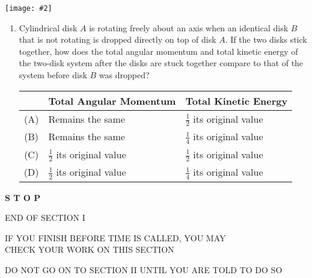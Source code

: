 \documentclass[11pt]{article}
\newcommand{\pic}[2]{\texttt{[image: \#2]}}
\begin{document}
\newpage
\begin{center}
  \pic{.3}{disks}
  
  \begin{minipage}{.6\textwidth}
    \begin{enumerate}[leftmargin=18pt,start=30]
  \item Cylindrical disk $A$ is rotating freely about an axis when an
    identical disk $B$ that is not rotating is dropped directly on top of disk
    $A$. If the two disks stick together, how does the total angular momentum
    and total kinetic energy of the two-disk system after the disks are stuck
    together compare to that of the system before disk $B$ was dropped?
      
    \begin{tabular}{cll}
      & Total Angular Momentum & Total Kinetic Energy\\
      \hline
      (A) & Remains the same & $\frac12$ its original value\\
      (B) & Remains the same & $\frac14$ its original value\\
      (C) & $\frac12$ its original value & $\frac12$ its original value\\
      (D) & $\frac12$ its original value & $\frac14$ its original value
    \end{tabular}
  \end{enumerate}
  \end{minipage}
\end{center}
\begin{center}
  \textbf{\LARGE S T O P}
  
  \vspace{.3in}END OF SECTION I

  \vspace{.3in}IF YOU FINISH BEFORE TIME IS CALLED, YOU MAY\\
  CHECK YOUR WORK ON THIS SECTION

  \vspace{.3in}DO NOT GO ON TO SECTION II UNTIL YOU ARE TOLD TO DO SO
\end{center}
\end{document}
